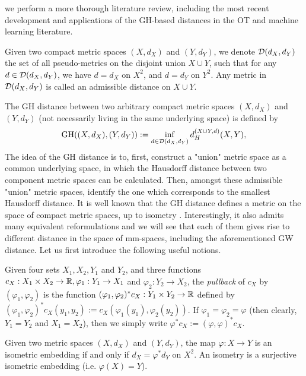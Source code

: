 we perform a more thorough literature review, including the most recent development and
applications of the GH-based distances in the OT and machine learning literature.
\begin{definition}
  Given two compact metric spaces $(X,d_X)$ and $(Y,d_Y)$, we denote $\mathcal D(d_X,d_Y)$
  the set of all pseudo-metrics on the disjoint union $X \cup Y$, such that for any
  $d \in \mathcal D(d_X,d_Y)$, we have $d = d_X$ on $X^2$, and $d = d_Y$ on $Y^2$.
  Any metric in $\mathcal D(d_X,d_Y)$ is called an admissible distance on $X \cup Y$.
\end{definition}
The GH distance between two arbitrary compact metric spaces $(X,d_X)$ and $(Y,d_Y)$
(not necessarily living in the same underlying space) is defined by
\begin{align}
  \label{GH:zeroth}
  \text{GH}((X,d_X), (Y,d_Y)) := \inf_{d \in \mathcal D(d_X,d_Y)} d_{H}^{(X \cup Y, d)}(X, Y),
\end{align}
The idea of the GH distance is to, first, construct a "union" metric space as a common underlying space,
in which the Hausdorff distance between two component metric spaces can be calculated. Then,
amongst these admissible "union" metric spaces, identify the one which
corresponds to the smallest Hausdorff distance.
It is well known that the GH distance defines a metric on the space of compact metric spaces,
up to isometry \citep{Gromov99,Burago01}. Interestingly, it also admits many
equivalent reformulations and we will see that each of them gives rise to different
distance in the space of mm-spaces, including the aforementioned GW distance.
Let us first introduce the following useful notions.
\begin{definition}[Pullback]
  \label{def:pullback}
  Given four sets $X_1, X_2, Y_1$ and $Y_2$,
  and three functions $c_X: X_1 \times X_2 \to \mathbb R, \varphi_1: Y_1 \to X_1$ and
  $\varphi_2: Y_2 \to X_2$, the \textit{pullback} of $c_X$ by $(\varphi_1, \varphi_2)$
  is the function $(\varphi_1, \varphi_2)^* c_X: Y_1 \times Y_2 \to \mathbb R$ defined by
  $(\varphi_1, \varphi_2)^*c_X (y_1,y_2) := c_X(\varphi_1(y_1), \varphi_2(y_2))$.
  If $\varphi_1 = \varphi_2 = \varphi$ (then clearly, $Y_1 = Y_2$ and $X_1 = X_2$),
  then we simply write $\varphi^*c_X := (\varphi, \varphi)^*c_X$.
\end{definition}
\begin{definition}
  Given two metric spaces $(X,d_X)$ and $(Y,d_Y)$,
  the map $\varphi: X \to Y$ is an isometric embedding if and only if $d_X = \varphi^* d_Y$ on $X^2$.
  An isometry is a surjective isometric embedding (i.e. $\varphi(X) = Y$).
\end{definition}
